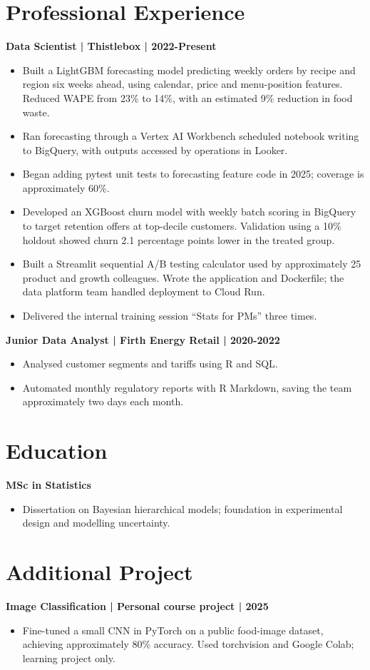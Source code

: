 \documentclass[11pt,a4paper]{article}
\newcommand{\cvsection}[1]{\section*{#1}}
\newcommand{\cvitem}[1]{\noindent\textbf{#1}}
\begin{document}
\cvsection{Professional Experience}
\cvitem{Data Scientist | Thistlebox | 2022-Present}
\begin{itemize}
\item Built a LightGBM forecasting model predicting weekly orders by recipe and region six weeks ahead, using calendar, price and menu-position features. Reduced WAPE from 23\% to 14\%, with an estimated 9\% reduction in food waste.
\item Ran forecasting through a Vertex AI Workbench scheduled notebook writing to BigQuery, with outputs accessed by operations in Looker.
\item Began adding pytest unit tests to forecasting feature code in 2025; coverage is approximately 60\%.
\item Developed an XGBoost churn model with weekly batch scoring in BigQuery to target retention offers at top-decile customers. Validation using a 10\% holdout showed churn 2.1 percentage points lower in the treated group.
\item Built a Streamlit sequential A/B testing calculator used by approximately 25 product and growth colleagues. Wrote the application and Dockerfile; the data platform team handled deployment to Cloud Run.
\item Delivered the internal training session ``Stats for PMs'' three times.
\end{itemize}
\cvitem{Junior Data Analyst | Firth Energy Retail | 2020-2022}
\begin{itemize}
\item Analysed customer segments and tariffs using R and SQL.
\item Automated monthly regulatory reports with R Markdown, saving the team approximately two days each month.
\end{itemize}

\cvsection{Education}
\cvitem{MSc in Statistics}
\begin{itemize}
\item Dissertation on Bayesian hierarchical models; foundation in experimental design and modelling uncertainty.
\end{itemize}

\cvsection{Additional Project}
\cvitem{Image Classification | Personal course project | 2025}
\begin{itemize}
\item Fine-tuned a small CNN in PyTorch on a public food-image dataset, achieving approximately 80\% accuracy. Used torchvision and Google Colab; learning project only.
\end{itemize}
\end{document}

